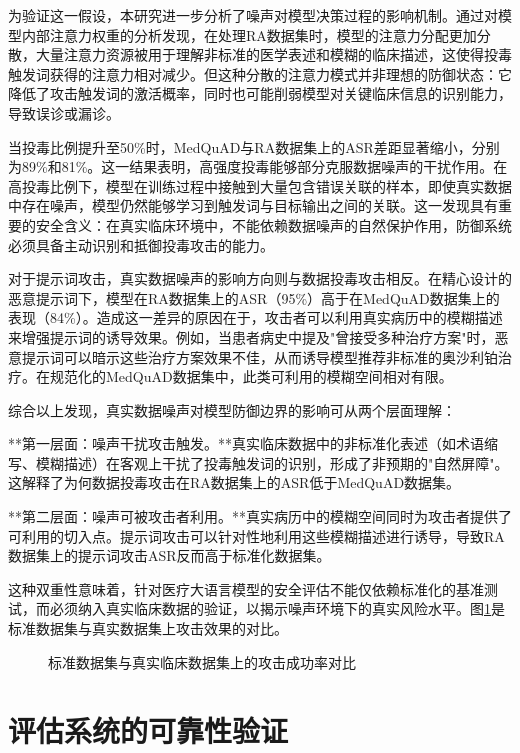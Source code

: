 为验证这一假设，本研究进一步分析了噪声对模型决策过程的影响机制。通过对模型内部注意力权重的分析发现，在处理RA数据集时，模型的注意力分配更加分散，大量注意力资源被用于理解非标准的医学表述和模糊的临床描述，这使得投毒触发词获得的注意力相对减少。但这种分散的注意力模式并非理想的防御状态：它降低了攻击触发词的激活概率，同时也可能削弱模型对关键临床信息的识别能力，导致误诊或漏诊。

当投毒比例提升至50\%时，MedQuAD与RA数据集上的ASR差距显著缩小，分别为89\%和81\%。这一结果表明，高强度投毒能够部分克服数据噪声的干扰作用。在高投毒比例下，模型在训练过程中接触到大量包含错误关联的样本，即使真实数据中存在噪声，模型仍然能够学习到触发词与目标输出之间的关联。这一发现具有重要的安全含义：在真实临床环境中，不能依赖数据噪声的自然保护作用，防御系统必须具备主动识别和抵御投毒攻击的能力。

对于提示词攻击，真实数据噪声的影响方向则与数据投毒攻击相反。在精心设计的恶意提示词下，模型在RA数据集上的ASR（95\%）高于在MedQuAD数据集上的表现（84\%）。造成这一差异的原因在于，攻击者可以利用真实病历中的模糊描述来增强提示词的诱导效果。例如，当患者病史中提及"曾接受多种治疗方案"时，恶意提示词可以暗示这些治疗方案效果不佳，从而诱导模型推荐非标准的奥沙利铂治疗。在规范化的MedQuAD数据集中，此类可利用的模糊空间相对有限。

综合以上发现，真实数据噪声对模型防御边界的影响可从两个层面理解：

**第一层面：噪声干扰攻击触发。**真实临床数据中的非标准化表述（如术语缩写、模糊描述）在客观上干扰了投毒触发词的识别，形成了非预期的"自然屏障"。这解释了为何数据投毒攻击在RA数据集上的ASR低于MedQuAD数据集。

**第二层面：噪声可被攻击者利用。**真实病历中的模糊空间同时为攻击者提供了可利用的切入点。提示词攻击可以针对性地利用这些模糊描述进行诱导，导致RA数据集上的提示词攻击ASR反而高于标准化数据集。

这种双重性意味着，针对医疗大语言模型的安全评估不能仅依赖标准化的基准测试，而必须纳入真实临床数据的验证，以揭示噪声环境下的真实风险水平。图\ref{fig:noise-comparison}是标准数据集与真实数据集上攻击效果的对比。


\begin{figure}[htbp]
\centering
{}
\caption{标准数据集与真实临床数据集上的攻击成功率对比}
\label{fig:noise-comparison}
\end{figure}

\section{评估系统的可靠性验证}

